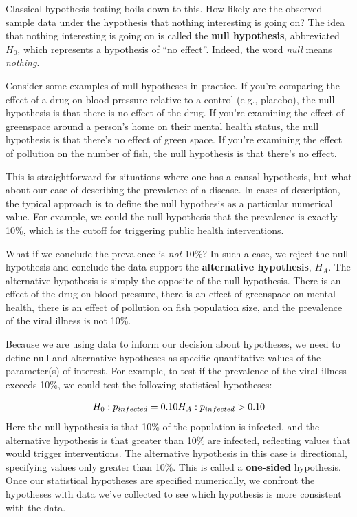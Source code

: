 \documentclass[
]{book}
\begin{document}
Classical hypothesis testing boils down to this. How likely are the observed sample data under the hypothesis that nothing interesting is going on? The idea that nothing interesting is going on is called the \textbf{null hypothesis}, abbreviated \(H_{0}\), which represents a hypothesis of ``no effect''. Indeed, the word \emph{null} means \emph{nothing}.

Consider some examples of null hypotheses in practice. If you're comparing the effect of a drug on blood pressure relative to a control (e.g., placebo), the null hypothesis is that there is no effect of the drug. If you're examining the effect of greenspace around a person's home on their mental health status, the null hypothesis is that there's no effect of green space. If you're examining the effect of pollution on the number of fish, the null hypothesis is that there's no effect.

This is straightforward for situations where one has a causal hypothesis, but what about our case of describing the prevalence of a disease. In cases of description, the typical approach is to define the null hypothesis as a particular numerical value. For example, we could the null hypothesis that the prevalence is exactly 10\%, which is the cutoff for triggering public health interventions.

What if we conclude the prevalence is \emph{not} 10\%? In such a case, we reject the null hypothesis and conclude the data support the \textbf{alternative hypothesis}, \(H_A\). The alternative hypothesis is simply the opposite of the null hypothesis. There is an effect of the drug on blood pressure, there is an effect of greenspace on mental health, there is an effect of pollution on fish population size, and the prevalence of the viral illness is not 10\%.

Because we are using data to inform our decision about hypotheses, we need to define null and alternative hypotheses as specific quantitative values of the parameter(s) of interest. For example, to test if the prevalence of the viral illness exceeds 10\%, we could test the following statistical hypotheses:

\[
H_0: p_{infected}=0.10 \\
H_A: p_{infected}>0.10
\] Here the null hypothesis is that 10\% of the population is infected, and the alternative hypothesis is that greater than 10\% are infected, reflecting values that would trigger interventions. The alternative hypothesis in this case is directional, specifying values only greater than 10\%. This is called a \textbf{one-sided} hypothesis. Once our statistical hypotheses are specified numerically, we confront the hypotheses with data we've collected to see which hypothesis is more consistent with the data.
\end{document}
